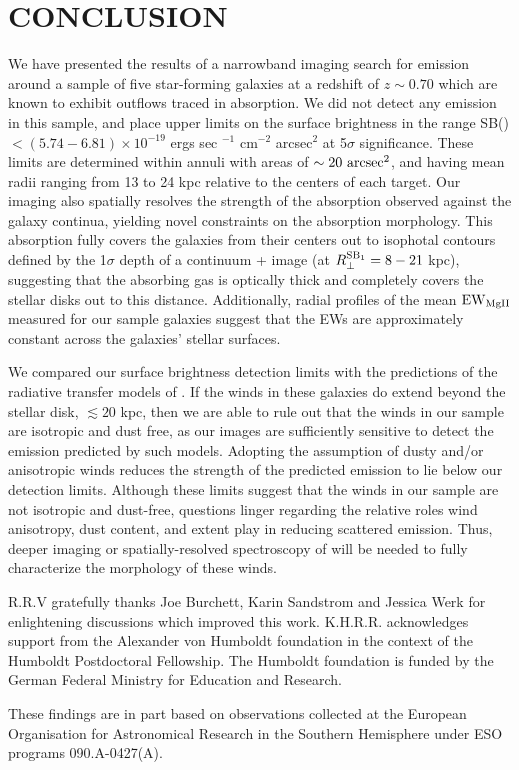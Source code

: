 \documentclass[twocolumn]{aastex62}
\begin{document}
\section{CONCLUSION}\label{sec:conclusion}
We have presented the results of a narrowband imaging search for  emission around a sample of five star-forming galaxies at a redshift of $z \sim 0.70$ which are known to exhibit outflows traced in  absorption. We did not detect any  emission in this sample, and place  upper limits on the surface brightness in the range SB() $< (5.74-6.81) \times 10^{-19}$ ergs sec $^{-1}$ cm$^{-2}$ arcsec$^2$ at 5$\sigma$ significance. These limits are determined within annuli with areas of $\sim 20~\rm arcsec^2$, and having mean radii ranging from 13 to 24 kpc relative to the centers of each target. Our imaging also spatially resolves the strength of the  absorption observed against the galaxy continua, yielding novel constraints on the  absorption morphology. 
This absorption fully covers the galaxies from their centers out to isophotal contours defined by the %
1$\sigma$ depth of a continuum +  image (at %
$R_{\perp}^{\rm SB_1} = 8-21$ kpc),
suggesting that the absorbing gas is optically thick and completely covers the stellar disks out to this distance. Additionally, radial profiles of the mean $\rm EW_{MgII}$ measured for our sample galaxies suggest that the EWs %
are approximately constant across the galaxies' stellar surfaces. 

We compared our surface brightness detection limits with the predictions of the radiative transfer models of \cite{Prochaska_2011}. If the winds in these galaxies do extend beyond the stellar disk, $\lesssim 20$ kpc, then we are able to rule out that the winds in our sample are isotropic and dust free, as our images are sufficiently sensitive to detect the emission predicted by such models. Adopting the assumption of dusty and/or anisotropic winds reduces the strength of the predicted  emission to lie below our detection limits. Although these limits suggest that the winds in our sample are not isotropic and dust-free, questions linger regarding the relative roles wind anisotropy, dust content, and extent play in reducing scattered emission. Thus, deeper imaging or spatially-resolved spectroscopy of  will be needed to fully characterize the morphology of these winds. 

\acknowledgements
R.R.V gratefully thanks Joe Burchett, Karin Sandstrom and Jessica Werk for enlightening discussions which improved this work.
K.H.R.R. acknowledges support from the Alexander von Humboldt foundation in the context of the Humboldt Postdoctoral Fellowship. The Humboldt foundation is funded by the German Federal Ministry for Education and Research.

These findings are in part based on observations collected at the
European Organisation for Astronomical Research in the Southern
Hemisphere under ESO programs 090.A-0427(A).

\newpage

\end{document}
